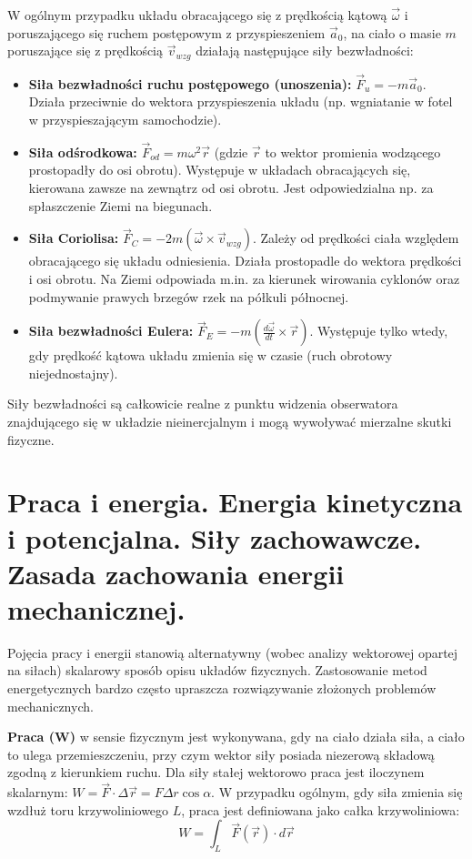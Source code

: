 \documentclass[11pt, a4paper]{article}
\begin{document}
W ogólnym przypadku układu obracającego się z prędkością kątową $\vec{\omega}$ i poruszającego się ruchem postępowym z przyspieszeniem $\vec{a}_0$, na ciało o masie $m$ poruszające się z prędkością $\vec{v}_{wzg}$ działają następujące siły bezwładności:
\begin{itemize}
    \item \textbf{Siła bezwładności ruchu postępowego (unoszenia):} $\vec{F}_u = -m\vec{a}_0$. Działa przeciwnie do wektora przyspieszenia układu (np. wgniatanie w fotel w przyspieszającym samochodzie).
    \item \textbf{Siła odśrodkowa:} $\vec{F}_{od} = m\omega^2\vec{r}$ (gdzie $\vec{r}$ to wektor promienia wodzącego prostopadły do osi obrotu). Występuje w układach obracających się, kierowana zawsze na zewnątrz od osi obrotu. Jest odpowiedzialna np. za spłaszczenie Ziemi na biegunach.
    \item \textbf{Siła Coriolisa:} $\vec{F}_C = -2m(\vec{\omega} \times \vec{v}_{wzg})$. Zależy od prędkości ciała względem obracającego się układu odniesienia. Działa prostopadle do wektora prędkości i osi obrotu. Na Ziemi odpowiada m.in. za kierunek wirowania cyklonów oraz podmywanie prawych brzegów rzek na półkuli północnej.
    \item \textbf{Siła bezwładności Eulera:} $\vec{F}_E = -m(\frac{d\vec{\omega}}{dt} \times \vec{r})$. Występuje tylko wtedy, gdy prędkość kątowa układu zmienia się w czasie (ruch obrotowy niejednostajny).
\end{itemize}
Siły bezwładności są całkowicie realne z punktu widzenia obserwatora znajdującego się w układzie nieinercjalnym i mogą wywoływać mierzalne skutki fizyczne.

\section{Praca i energia. Energia kinetyczna i potencjalna. Siły zachowawcze. Zasada zachowania energii mechanicznej.}

Pojęcia pracy i energii stanowią alternatywny (wobec analizy wektorowej opartej na siłach) skalarowy sposób opisu układów fizycznych. Zastosowanie metod energetycznych bardzo często upraszcza rozwiązywanie złożonych problemów mechanicznych.

\textbf{Praca (W)} w sensie fizycznym jest wykonywana, gdy na ciało działa siła, a ciało to ulega przemieszczeniu, przy czym wektor siły posiada niezerową składową zgodną z kierunkiem ruchu. Dla siły stałej wektorowo praca jest iloczynem skalarnym: $W = \vec{F} \cdot \Delta\vec{r} = F \Delta r \cos\alpha$. W przypadku ogólnym, gdy siła zmienia się wzdłuż toru krzywoliniowego $L$, praca jest definiowana jako całka krzywoliniowa:
\[
W = \int_L \vec{F}(\vec{r}) \cdot d\vec{r}
\]
\end{document}
